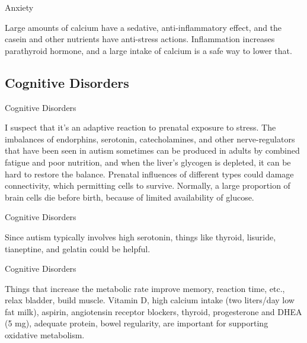 \documentclass[11pt,oneside,openany,extrafontsizes]{memoir}
\begin{document}
\begin{standalonequote}{Anxiety}

    \begin{answer}
      Large amounts of calcium have a sedative, anti-inflammatory effect, and the casein and other nutrients have anti-stress actions. Inflammation increases parathyroid hormone, and a large intake of calcium is a safe way to lower that.
    \end{answer}
\end{standalonequote}

\subsection{Cognitive Disorders}

\begin{standalonequote}{Cognitive Disorders}

    \begin{answer}
        I suspect that it's an adaptive reaction to prenatal exposure to stress. The imbalances of endorphins, serotonin, catecholamines, and other nerve-regulators that have been seen in autism sometimes can be produced in adults by combined fatigue and poor nutrition, and when the liver's glycogen is depleted, it can be hard to restore the balance. Prenatal influences of different types could damage connectivity, which permitting cells to survive. Normally, a large proportion of brain cells die before birth, because of limited availability of glucose.
    \end{answer}
\end{standalonequote}

\begin{standalonequote}{Cognitive Disorders}

    \begin{answer}
        Since autism typically involves high serotonin, things like thyroid, lisuride, tianeptine, and gelatin could be helpful.
    \end{answer}
\end{standalonequote}

\begin{standalonequote}{Cognitive Disorders}

    \begin{answer}
      Things that increase the metabolic rate improve memory, reaction time, etc., relax bladder, build muscle. Vitamin D, high calcium intake (two liters/day low fat milk), aspirin, angiotensin receptor blockers, thyroid, progesterone and DHEA (5 mg), adequate protein, bowel regularity, are important for supporting oxidative metabolism.
    \end{answer}
\end{standalonequote}
\end{document}
